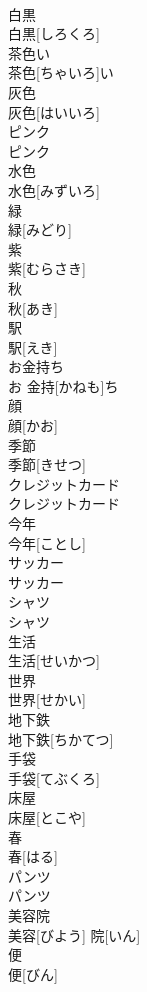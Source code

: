 \documentclass[8pt]{extreport}
\begin{document}
\begin{CJK}{UTF8}{min}
\\	白黒	
\\	白黒[しろくろ]
\\	茶色い	
\\	茶色[ちゃいろ]い
\\	灰色	
\\	灰色[はいいろ]
\\	ピンク	
\\	ピンク
\\	水色	
\\	水色[みずいろ]
\\	緑	
\\	緑[みどり]
\\	紫	
\\	紫[むらさき]
\\	秋	
\\	秋[あき]
\\	駅	
\\	駅[えき]
\\	お金持ち	
\\	お 金持[かねも]ち
\\	顔	
\\	顔[かお]
\\	季節	
\\	季節[きせつ]
\\	クレジットカード	
\\	クレジットカード
\\	今年	
\\	今年[ことし]
\\	サッカー	
\\	サッカー
\\	シャツ	
\\	シャツ
\\	生活	
\\	生活[せいかつ]
\\	世界	
\\	世界[せかい]
\\	地下鉄	
\\	地下鉄[ちかてつ]
\\	手袋	
\\	手袋[てぶくろ]
\\	床屋	
\\	床屋[とこや]
\\	春	
\\	春[はる]
\\	パンツ	
\\	パンツ
\\	美容院	
\\	美容[びよう] 院[いん]
\\	便	
\\	便[びん]

\end{CJK}
\end{document}
